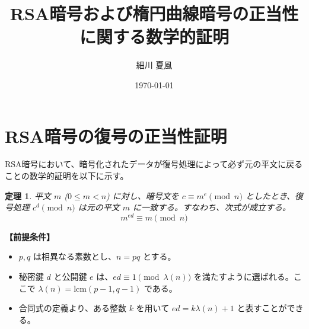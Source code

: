 \documentclass[11pt,a4paper]{ltjsarticle}
\newtheorem{theorem}{定理}
\begin{document}
\title{RSA暗号および楕円曲線暗号の正当性に関する数学的証明}
\author{細川 夏風}
\date{\today}

\maketitle

\section{RSA暗号の復号の正当性証明}

RSA暗号において、暗号化されたデータが復号処理によって必ず元の平文に戻ることの数学的証明を以下に示す。

\begin{theorem}
平文 $m$ ($0 \le m < n$) に対し、暗号文を $c \equiv m^e \pmod{n}$ としたとき、復号処理 $c^d \pmod{n}$ は元の平文 $m$ に一致する。すなわち、次式が成立する。
\[ m^{ed} \equiv m \pmod{n} \]
\end{theorem}

\textbf{【前提条件】}
\begin{itemize}
  \item $p, q$ は相異なる素数とし、$n = pq$ とする。
  \item 秘密鍵 $d$ と公開鍵 $e$ は、$ed \equiv 1 \pmod{\lambda(n)}$ を満たすように選ばれる。ここで $\lambda(n) = \mathrm{lcm}(p-1, q-1)$ である。
  \item 合同式の定義より、ある整数 $k$ を用いて $ed = k \lambda(n) + 1$ と表すことができる。
\end{itemize}
\end{document}
